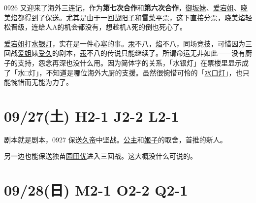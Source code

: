 0926 又迎来了海外三连记，作为\textbf{第七次合作}和\textbf{第六次合作}，\uline{御坂妹}、\uline{爱宕姐}、\uline{晓美焰}都得到了保送。尤其是由于一回战\uline{阳子}和\uline{雪菜}平票，这下直接分票，\uline{晓美焰}轻松晋级，连给人A的机会都没有，想趁机A死的倒也死心了。

\uline{爱宕姐}打\uline{水银灯}，实在是一件心塞的事。\uline{汞}不八，\uline{焰}不八，同场竞技，可惜因为三回战\uline{爱姐}婊\uline{受久}的剧本，\uline{汞}不八的传说只能继续了。所谓命运无非如此——没有厨子的支持，怨念再深也没什么用。因为简体字的关系，「水银灯」在票楼里显示成了「{\mincho 水$\!\!$□$\!\!$灯}」，不知道是哪位海外大厨的支援。虽然很惋惜可怜的「\uline{水口灯}」，也只能惋惜而无能为力了。

\section{09/27(土) H2-1 J2-2 L2-1}


剧本就是剧本，0927 保送\uline{久帝}中坚战。\uline{公主}和\uline{姬子}的取舍，首推的新人。

另一边也能保送独苗\uline{园田优}进入三回战。这大概没什么可说的。

\section{09/28(日) M2-1 O2-2 Q2-1}


